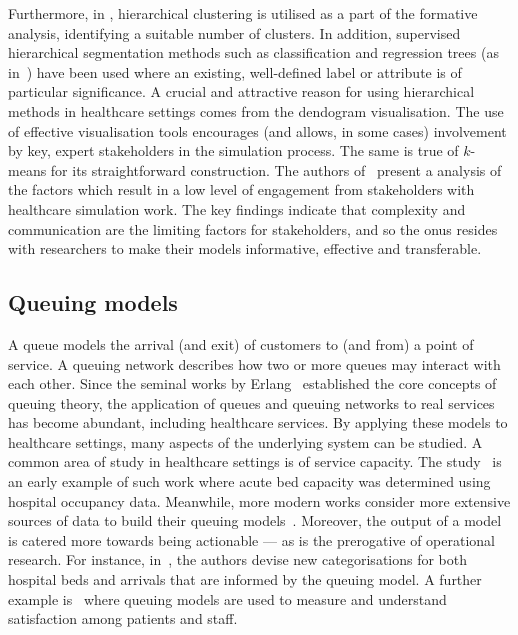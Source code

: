 Furthermore, in \cite{Vuik2016a}, hierarchical clustering is utilised as a part
of the formative analysis, identifying a suitable number of clusters. In
addition, supervised hierarchical segmentation methods such as classification
and regression trees (as in~\cite{Harper2006,Kumar2019}) have been used where an
existing, well-defined label or attribute is of particular significance. A
crucial and attractive reason for using hierarchical methods in healthcare
settings comes from the dendogram visualisation. The use of effective
visualisation tools encourages (and allows, in some cases) involvement by key,
expert stakeholders in the simulation process. The same is true of \(k\)-means
for its straightforward construction. The authors of~\cite{Jahangirian2015}
present a analysis of the factors which result in a low level of engagement from
stakeholders with healthcare simulation work. The key findings indicate that
complexity and communication are the limiting factors for stakeholders, and so
the onus resides with researchers to make their models informative, effective
and transferable.

\subsection{Queuing models}\label{subsec:queuing}

A queue models the arrival (and exit) of customers to (and from) a point of
service. A queuing network describes how two or more queues may interact with
each other. Since the seminal works by Erlang~\cite{Erlang1917,Erlang1920}
established the core concepts of queuing theory, the application of queues and
queuing networks to real services has become abundant, including healthcare
services. By applying these models to healthcare settings, many aspects of the
underlying system can be studied. A common area of study in healthcare settings
is of service capacity. The study~\cite{McClain1976} is an early example of such
work where acute bed capacity was determined using hospital occupancy data.
Meanwhile, more modern works consider more extensive sources of data to build
their queuing models~\cite{Palvannan2012,Pinto2014,Williams2015}. Moreover, the
output of a model is catered more towards being actionable --- as is the
prerogative of operational research. For instance, in~\cite{Pinto2014}, the
authors devise new categorisations for both hospital beds and arrivals that are
informed by the queuing model. A further example is~\cite{Komashie2015} where
queuing models are used to measure and understand satisfaction among patients
and staff.

